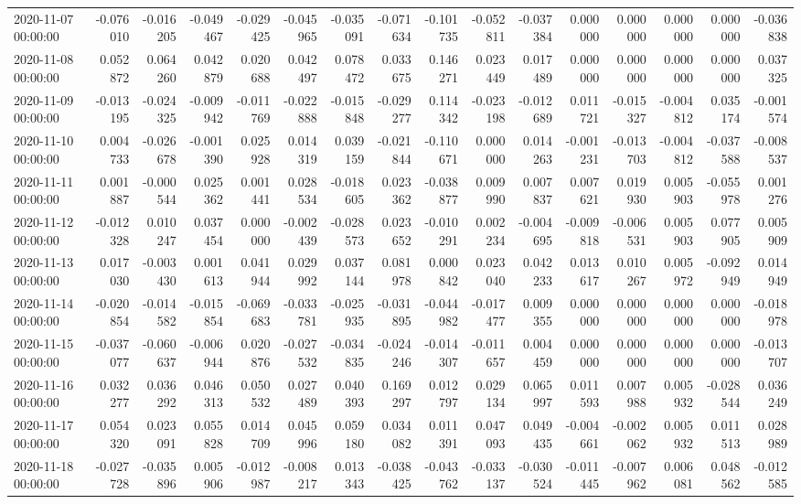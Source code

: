 \begin{tabular}{lrrrrrrrrrrrrrrr}
2020-11-07 00:00:00 & -0.076010 & -0.016205 & -0.049467 & -0.029425 & -0.045965 & -0.035091 & -0.071634 & -0.101735 & -0.052811 & -0.037384 & 0.000000 & 0.000000 & 0.000000 & 0.000000 & -0.036838 \\
2020-11-08 00:00:00 & 0.052872 & 0.064260 & 0.042879 & 0.020688 & 0.042497 & 0.078472 & 0.033675 & 0.146271 & 0.023449 & 0.017489 & 0.000000 & 0.000000 & 0.000000 & 0.000000 & 0.037325 \\
2020-11-09 00:00:00 & -0.013195 & -0.024325 & -0.009942 & -0.011769 & -0.022888 & -0.015848 & -0.029277 & 0.114342 & -0.023198 & -0.012689 & 0.011721 & -0.015327 & -0.004812 & 0.035174 & -0.001574 \\
2020-11-10 00:00:00 & 0.004733 & -0.026678 & -0.001390 & 0.025928 & 0.014319 & 0.039159 & -0.021844 & -0.110671 & 0.000000 & 0.014263 & -0.001231 & -0.013703 & -0.004812 & -0.037588 & -0.008537 \\
2020-11-11 00:00:00 & 0.001887 & -0.000544 & 0.025362 & 0.001441 & 0.028534 & -0.018605 & 0.023362 & -0.038877 & 0.009990 & 0.007837 & 0.007621 & 0.019930 & 0.005903 & -0.055978 & 0.001276 \\
2020-11-12 00:00:00 & -0.012328 & 0.010247 & 0.037454 & 0.000000 & -0.002439 & -0.028573 & 0.023652 & -0.010291 & 0.002234 & -0.004695 & -0.009818 & -0.006531 & 0.005903 & 0.077905 & 0.005909 \\
2020-11-13 00:00:00 & 0.017030 & -0.003430 & 0.001613 & 0.041944 & 0.029992 & 0.037144 & 0.081978 & 0.000842 & 0.023040 & 0.042233 & 0.013617 & 0.010267 & 0.005972 & -0.092949 & 0.014949 \\
2020-11-14 00:00:00 & -0.020854 & -0.014582 & -0.015854 & -0.069683 & -0.033781 & -0.025935 & -0.031895 & -0.044982 & -0.017477 & 0.009355 & 0.000000 & 0.000000 & 0.000000 & 0.000000 & -0.018978 \\
2020-11-15 00:00:00 & -0.037077 & -0.060637 & -0.006944 & 0.020876 & -0.027532 & -0.034835 & -0.024246 & -0.014307 & -0.011657 & 0.004459 & 0.000000 & 0.000000 & 0.000000 & 0.000000 & -0.013707 \\
2020-11-16 00:00:00 & 0.032277 & 0.036292 & 0.046313 & 0.050532 & 0.027489 & 0.040393 & 0.169297 & 0.012797 & 0.029134 & 0.065997 & 0.011593 & 0.007988 & 0.005932 & -0.028544 & 0.036249 \\
2020-11-17 00:00:00 & 0.054320 & 0.023091 & 0.055828 & 0.014709 & 0.045996 & 0.059180 & 0.034082 & 0.011391 & 0.047093 & 0.049435 & -0.004661 & -0.002062 & 0.005932 & 0.011513 & 0.028989 \\
2020-11-18 00:00:00 & -0.027728 & -0.035896 & 0.005906 & -0.012987 & -0.008217 & 0.013343 & -0.038425 & -0.043762 & -0.033137 & -0.030524 & -0.011445 & -0.007962 & 0.006081 & 0.048562 & -0.012585 \\

\end{tabular}
